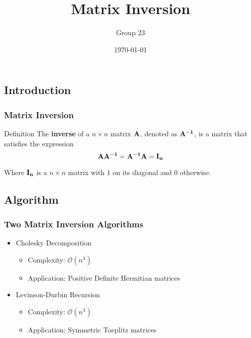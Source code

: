 \documentclass{beamer}
\title{Matrix Inversion}
\author{Group 23}
\institute{UM-SJTU Joint Institute}
\date{\today}
\begin{document}
\begin{frame}
	\titlepage
\end{frame}

\begin{frame}
	\tableofcontents
\end{frame}


\begin{frame}
	\section{Introduction}
	\frametitle{Matrix Inversion}
	\begin{block}{Definition}
		The {\bf  inverse} of a $n\times n$ matrix ${\bf A}$, denoted as ${\bf A^{-1}}$, is a matrix that satisfies the expression $${\bf AA^{-1}=A^{-1}A=I_n}$$

		Where ${\bf I_n}$ is a $n\times n$ matrix with $1$ on its diagonal and $0$ otherwise.
	\end{block}
\end{frame}


\begin{frame}
	\section{Algorithm}
	\frametitle{Two Matrix Inversion Algorithms}
	\begin{itemize}
		\item Cholesky Decomposition 
		\begin{itemize}
			\item Complexity: $\mathcal{O}(n^3)$
			\item Application: Positive Definite Hermitian matrices
		\end{itemize}
		\item Levinson-Durbin Recursion
		\begin{itemize}
			\item Complexity: $\mathcal{O}(n^3)$
			\item Application: Symmetric Toeplitz matrices
		\end{itemize}
	\end{itemize}
\end{frame}
\end{document}
